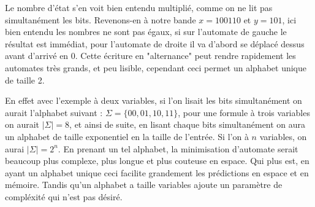 Le nombre d'état s'en voit bien entendu multiplié, comme on ne lit pas simultanément les bits. Revenons-en à notre bande $x = 100110$ et $y = 101$, ici bien entendu les nombres ne sont pas égaux, si sur l'automate de gauche le résultat est immédiat, pour l'automate de droite il va d'abord se déplacé dessus avant d'arrivé en 0. Cette écriture en "alternance" peut rendre rapidement les automates très grands, et peu lisible, cependant ceci permet un alphabet unique de taille 2.\\\par

En effet avec l'exemple à deux variables, si l'on lisait les bits simultanément on aurait l'alphabet suivant : $\Sigma = \{00, 01, 10, 11\}$, pour une formule à trois variables on aurait $|\Sigma| = 8$, et ainsi de suite, en lisant chaque bits simultanément on aura un alphabet de taille exponentiel en la taille de l'entrée. Si l'on à $n$ variables, on aurai $|\Sigma| = 2^n$. En prenant un tel alphabet, la minimisation d'automate serait beaucoup plus complexe, plus longue et plus couteuse en espace. Qui plus est, en ayant un alphabet unique ceci facilite grandement les prédictions en espace et en mémoire. Tandis qu'un alphabet a taille variables ajoute un paramètre de compléxité qui n'est pas désiré.

